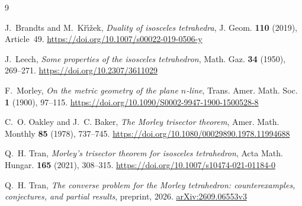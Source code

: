 \documentclass[11pt]{amsart}
\theoremstyle{definition}
\theoremstyle{remark}
\numberwithin{equation}{section}
\providecommand{\doi}[1]{\url{https://doi.org/#1}}
\begin{document}
\begin{thebibliography}{9}

J.~Brandts and M.~K\v{r}\'{\i}\v{z}ek, \emph{Duality of isosceles tetrahedra}, J. Geom. \textbf{110} (2019), Article~49. \doi{10.1007/s00022-019-0506-y}

J.~Leech, \emph{Some properties of the isosceles tetrahedron}, Math. Gaz. \textbf{34} (1950), 269--271. \doi{10.2307/3611029}

F.~Morley, \emph{On the metric geometry of the plane $n$-line}, Trans. Amer. Math. Soc. \textbf{1} (1900), 97--115. \doi{10.1090/S0002-9947-1900-1500528-8}

C.~O. Oakley and J.~C. Baker, \emph{The Morley trisector theorem}, Amer. Math. Monthly \textbf{85} (1978), 737--745. \doi{10.1080/00029890.1978.11994688}

Q.~H. Tran, \emph{Morley's trisector theorem for isosceles tetrahedron}, Acta Math. Hungar. \textbf{165} (2021), 308--315. \doi{10.1007/s10474-021-01184-0}

Q.~H. Tran, \emph{The converse problem for the Morley tetrahedron: counterexamples, conjectures, and partial results}, preprint, 2026. \href{https://arxiv.org/abs/2609.06553v3}{arXiv:2609.06553v3}

\end{thebibliography}
\end{document}
